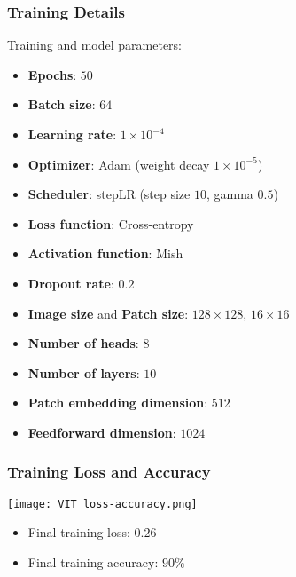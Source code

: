 \documentclass[../presentation.tex]{subfiles} %
\begin{document}
\begin{frame}
    
    \frametitle{Training Details}

    Training and model parameters:
    \vspace{0.1cm}
    \begin{itemize}
        \item \textbf{Epochs}: $50$
        \item \textbf{Batch size}: $64$
        \item \textbf{Learning rate}: $1\times10^{-4}$
        \item \textbf{Optimizer}: Adam (weight decay $1\times10^{-5}$)
        \item \textbf{Scheduler}: stepLR (step size $10$, gamma $0.5$)
        \item \textbf{Loss function}: Cross-entropy
        \item \textbf{Activation function}: Mish
        \item \textbf{Dropout rate}: $0.2$
        \item \textbf{Image size} and \textbf{Patch size}: $128\times128$, $16\times16$
        \item \textbf{Number of heads}: $8$
        \item \textbf{Number of layers}: $10$
        \item \textbf{Patch embedding dimension}: $512$
        \item \textbf{Feedforward dimension}: $1024$
    \end{itemize}

\end{frame}

\begin{frame}
    
    \frametitle{Training Loss and Accuracy}

    \begin{center}
        \texttt{[image: VIT\_loss-accuracy.png]}
    \end{center}

    \small{
    \begin{cbox}
        \begin{itemize}
            \item Final training loss: $0.26$
            \item Final training accuracy: $90\%$
        \end{itemize}
    \end{cbox}
    }

\end{frame}
\end{document}

